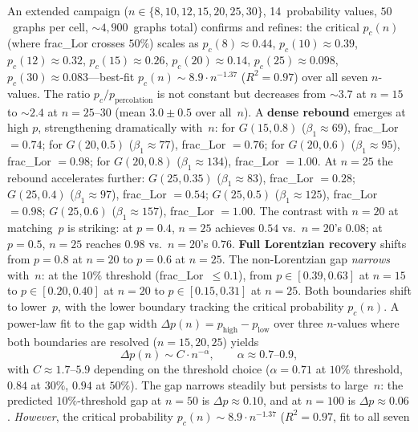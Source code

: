\documentclass[11pt]{article}
\theoremstyle{definition}
\theoremstyle{remark}
\begin{document}
An extended campaign ($n \in \{8, 10, 12, 15, 20, 25, 30\}$,
14~probability values, $50$~graphs per cell, ${\sim}4{,}900$~graphs total)
confirms and refines: the critical $p_c(n)$ (where frac\_Lor crosses $50\%$)
scales as $p_c(8) \approx 0.44$, $p_c(10) \approx 0.39$,
$p_c(12) \approx 0.32$, $p_c(15) \approx 0.26$, $p_c(20) \approx 0.14$,
$p_c(25) \approx 0.098$, $p_c(30) \approx 0.083$---best-fit
$p_c(n) \sim 8.9 \cdot n^{-1.37}$ ($R^2 = 0.97$) over all seven $n$-values.
The ratio $p_c / p_{\mathrm{percolation}}$ is not constant but decreases
from ${\sim}3.7$ at $n = 15$ to ${\sim}2.4$ at $n = 25$--$30$ (mean
$3.0 \pm 0.5$ over all~$n$).
A \textbf{dense rebound} emerges at high $p$, strengthening dramatically
with~$n$:
for $G(15, 0.8)$ ($\beta_1 \approx 69$), frac\_Lor $= 0.74$;
for $G(20, 0.5)$ ($\beta_1 \approx 77$), frac\_Lor $= 0.76$;
for $G(20, 0.6)$ ($\beta_1 \approx 95$), frac\_Lor $= 0.98$;
for $G(20, 0.8)$ ($\beta_1 \approx 134$), frac\_Lor $= 1.00$.
At $n = 25$ the rebound accelerates further:
$G(25, 0.35)$ ($\beta_1 \approx 83$), frac\_Lor $= 0.28$;
$G(25, 0.4)$ ($\beta_1 \approx 97$), frac\_Lor $= 0.54$;
$G(25, 0.5)$ ($\beta_1 \approx 125$), frac\_Lor $= 0.98$;
$G(25, 0.6)$ ($\beta_1 \approx 157$), frac\_Lor $= 1.00$.
The contrast with $n = 20$ at matching~$p$ is striking: at $p = 0.4$,
$n = 25$ achieves $0.54$ vs.\ $n = 20$'s $0.08$; at $p = 0.5$,
$n = 25$ reaches $0.98$ vs.\ $n = 20$'s $0.76$.
\textbf{Full Lorentzian recovery} shifts from $p = 0.8$ at $n = 20$ to
$p = 0.6$ at $n = 25$.
The non-Lorentzian gap \emph{narrows} with~$n$: at the $10\%$ threshold
(frac\_Lor~$\leq 0.1$), from $p \in [0.39, 0.63]$ at $n = 15$
to $p \in [0.20, 0.40]$ at $n = 20$
to $p \in [0.15, 0.31]$ at $n = 25$.
Both boundaries shift to lower~$p$, with the lower boundary tracking
the critical probability $p_c(n)$.
A power-law fit to the gap width $\Delta p(n) = p_{\mathrm{high}} - p_{\mathrm{low}}$
over three $n$-values where both boundaries are resolved ($n = 15, 20, 25$)
yields
\begin{equation}
  \Delta p(n) \sim C \cdot n^{-\alpha}, \qquad \alpha \approx 0.7\text{--}0.9,
  \label{eq:gap-narrowing}
\end{equation}
with $C \approx 1.7$--$5.9$ depending on the threshold choice
($\alpha = 0.71$ at $10\%$ threshold, $0.84$ at $30\%$, $0.94$ at $50\%$).
The gap narrows steadily but persists to large~$n$: the predicted
$10\%$-threshold gap at $n = 50$ is $\Delta p \approx 0.10$, and at
$n = 100$ is $\Delta p \approx 0.06$.
\emph{However}, the critical probability
$p_c(n) \sim 8.9 \cdot n^{-1.37}$ ($R^2 = 0.97$, fit to all seven
\end{document}
